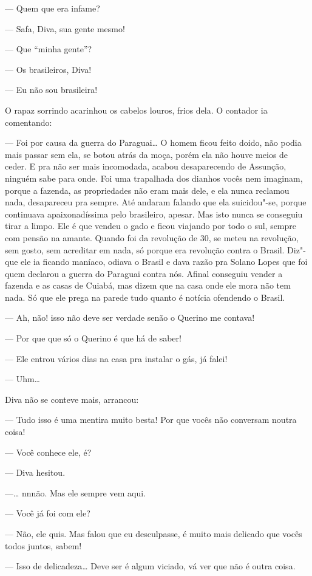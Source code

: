 \begin{linenumbers}
--- Quem que era infame?

--- Safa, Diva, sua gente mesmo!

--- Que ``minha gente''?

--- Os brasileiros, Diva!

--- Eu não sou brasileira!

O rapaz sorrindo acarinhou os cabelos louros, frios dela. O contador ia
comentando:

--- Foi por causa da guerra do Paraguai\ldots{} O homem ficou feito doido,
não podia mais passar sem ela, se botou atrás da moça, porém ela não
houve meios de ceder. E pra não ser mais incomodada, acabou
desaparecendo de Assunção, ninguém sabe para onde. Foi uma trapalhada
dos dianhos vocês nem imaginam, porque a fazenda, as propriedades não
eram mais dele, e ela nunca reclamou nada, desapareceu pra sempre. Até
andaram falando que ela suicidou"-se, porque continuava apaixonadíssima
pelo brasileiro, apesar. Mas isto nunca se conseguiu tirar a limpo. Ele
é que vendeu o gado e ficou viajando por todo o sul, sempre com pensão
na amante. Quando foi da revolução de 30, se meteu na revolução, sem
gosto, sem acreditar em nada, só porque era revolução contra o Brasil.
Diz"-que ele ia ficando maníaco, odiava o Brasil e dava razão pra Solano
Lopes que foi quem declarou a guerra do Paraguai contra nós. Afinal
conseguiu vender a fazenda e as casas de Cuiabá, mas dizem que na casa
onde ele mora não tem nada. Só que ele prega na parede tudo quanto é
notícia ofendendo o Brasil.

--- Ah, não! isso não deve ser verdade senão o Querino me contava!

--- Por que que só o Querino é que há de saber!

--- Ele entrou vários dias na casa pra instalar o gás, já falei!

--- Uhm\ldots{}

Diva não se conteve mais, arrancou:

--- Tudo isso é uma mentira muito besta! Por que vocês não conversam
noutra coisa!

--- Você conhece ele, é?

--- Diva hesitou.

---\ldots{} nnnão. Mas ele sempre vem aqui.

--- Você já foi com ele?

--- Não, ele quis. Mas falou que eu desculpasse, é muito mais delicado
que vocês todos juntos, sabem!

--- Isso de delicadeza\ldots{} Deve ser é algum viciado, vá ver que não é
outra coisa.


\end{linenumbers}

